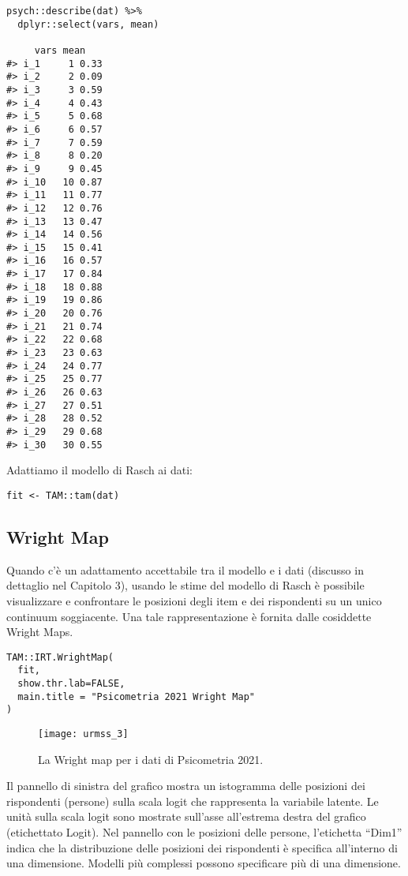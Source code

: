 \begin{lstlisting}
psych::describe(dat) %>% 
  dplyr::select(vars, mean)
  
     vars mean
#> i_1     1 0.33
#> i_2     2 0.09
#> i_3     3 0.59
#> i_4     4 0.43
#> i_5     5 0.68
#> i_6     6 0.57
#> i_7     7 0.59
#> i_8     8 0.20
#> i_9     9 0.45
#> i_10   10 0.87
#> i_11   11 0.77
#> i_12   12 0.76
#> i_13   13 0.47
#> i_14   14 0.56
#> i_15   15 0.41
#> i_16   16 0.57
#> i_17   17 0.84
#> i_18   18 0.88
#> i_19   19 0.86
#> i_20   20 0.76
#> i_21   21 0.74
#> i_22   22 0.68
#> i_23   23 0.63
#> i_24   24 0.77
#> i_25   25 0.77
#> i_26   26 0.63
#> i_27   27 0.51
#> i_28   28 0.52
#> i_29   29 0.68
#> i_30   30 0.55
\end{lstlisting} 
Adattiamo il modello di Rasch ai dati:

\begin{lstlisting} 
fit <- TAM::tam(dat)
\end{lstlisting} 

\subsection{Wright Map}

Quando c'è un adattamento accettabile tra il modello e i dati (discusso in dettaglio nel Capitolo 3), usando le stime del modello di Rasch è possibile visualizzare e confrontare le posizioni degli item e dei rispondenti su un unico continuum soggiacente. 
Una tale rappresentazione è fornita dalle cosiddette Wright Maps.

\begin{lstlisting} 
TAM::IRT.WrightMap(
  fit, 
  show.thr.lab=FALSE, 
  main.title = "Psicometria 2021 Wright Map"
)
\end{lstlisting} 

\begin{figure}[h!]
  \begin{center}
    \texttt{[image: urmss\_3]}
    \caption{La Wright map per i dati di Psicometria 2021.}
    \label{fig:nonpar_dic2}
  \end{center}
\end{figure}

Il pannello di sinistra del grafico mostra un istogramma delle posizioni dei rispondenti (persone) sulla scala logit che rappresenta la variabile latente. 
Le unità sulla scala logit sono mostrate sull'asse all'estrema destra del grafico (etichettato Logit).
Nel pannello con le posizioni delle persone, l'etichetta ``Dim1'' indica che la distribuzione delle posizioni dei rispondenti è specifica all'interno di una dimensione.
Modelli più complessi possono specificare più di una dimensione.

